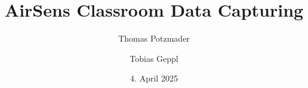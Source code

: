\documentclass[paper=a4, 12pt]{scrreprt}
\title{AirSens Classroom Data Capturing}
\author{Thomas Potzmader \and Tobias Geppl}
\date{4. April 2025}
\begin{document}
\frontmatter

\maketitle

\newpage\null\thispagestyle{empty}%

\begin{affidavit}
\end{affidavit}


\cleardoublepage                                              %





                             

\cleardoublepage                                              %

\renewcommand*\chapterpagestyle{scrheadings}
\tableofcontents
\end{document}
